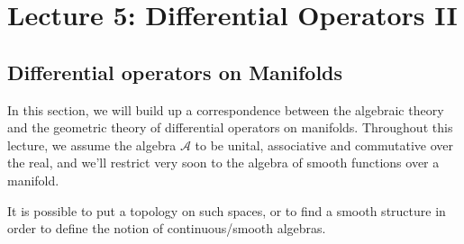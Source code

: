 % 
\newpage
{}
\section{Lecture 5: Differential Operators II} %
\label{sec:lecture_5_differential_operators_ii}
% 
\subsection{Differential operators on Manifolds} %
\label{sub:differential_operators_on_manifolds}
In this section, we will build up a correspondence between the algebraic theory and the geometric theory of differential operators on manifolds.
Throughout this lecture, we assume the algebra $\mathcal{A}$ to be unital, associative and commutative over the real, and we'll restrict very soon to the algebra of smooth functions over a manifold.

    It is possible to put a topology on such spaces, or to find a smooth structure in order to define the notion of continuous/smooth algebras.

